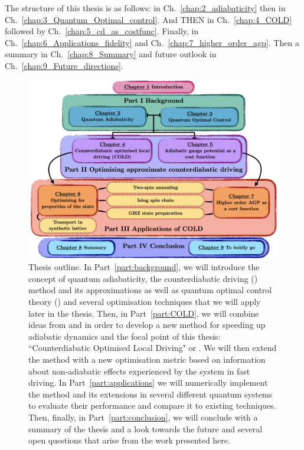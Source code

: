 The structure of this thesis is as follows: in Ch.~\ref{chap:2_adiabaticity} then in Ch.~\ref{chap:3_Quantum_Optimal_control}. And THEN in Ch.~\ref{chap:4_COLD} followed by Ch.~\ref{chap:5_cd_as_costfunc}. Finally, in Ch.~\ref{chap:6_Applications_fidelity} and Ch.~\ref{chap:7_higher_order_agp}. Then a summary in Ch.~\ref{chap:8_Summary} and future outlook in Ch.~\ref{chap:9_Future_directions}.

\begin{figure}[t!]
    \centering
    \includegraphics[width=\linewidth]{images/thesis_overview.png} \caption[Thesis outline.]{Thesis outline. In Part~\ref{part:background}, we will introduce the concept of quantum adiabaticity, the counterdiabatic driving () method and its approximations as well as quantum optimal control theory () and several optimisation techniques that we will apply later in the thesis. Then, in Part~\ref{part:COLD}, we will combine ideas from  and  in order to develop a new method for speeding up adiabatic dynamics and the focal point of this thesis: ``Counterdiabatic Optimised Local Driving" or . We will then extend the method with a new optimisation metric based on information about non-adiabatic effects experienced by the system in fast driving. In Part~\ref{part:applications} we will numerically implement the  method and its extensions in several different quantum systems to evaluate their performance and compare it to existing techniques. Then, finally, in Part~\ref{part:conclusion}, we will conclude with a summary of the thesis and a look towards the future and several open questions that arise from the work presented here.}\label{fig:thesis_overview}
\end{figure}


